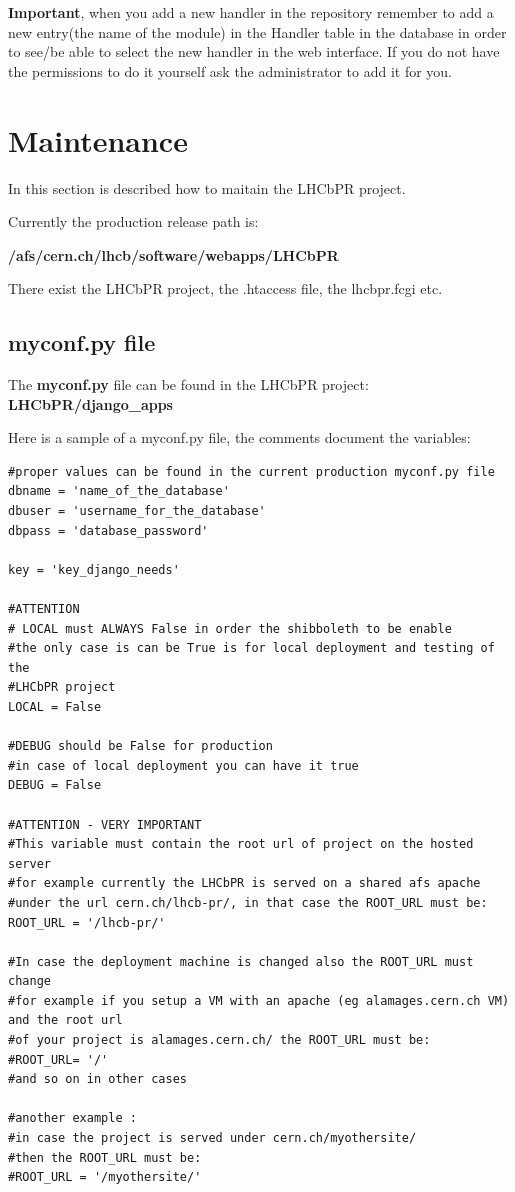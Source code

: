 \documentclass{lhcbnote}
\begin{document}
{\bf Important}, when you add a new handler in the repository remember to add a new entry(the name of the module) in the Handler table in the database
in order to see/be able to select the new handler in the web interface. If you do not have the permissions to do it yourself ask the administrator to add it for you.


\section {Maintenance}

In this section is described how to maitain the LHCbPR project.

\vspace {2mm}

Currently the production release path is: 

{\bf /afs/cern.ch/lhcb/software/webapps/LHCbPR}

There exist the LHCbPR project, the .htaccess file, the lhcbpr.fcgi etc.

\subsection{myconf.py file}

The {\bf myconf.py} file can be found in the LHCbPR project: {\bf LHCbPR/django\_apps}

Here is a sample of a myconf.py file, the comments document the variables:

\begin{verbatim}
#proper values can be found in the current production myconf.py file 
dbname = 'name_of_the_database'
dbuser = 'username_for_the_database'
dbpass = 'database_password'

key = 'key_django_needs'

#ATTENTION
# LOCAL must ALWAYS False in order the shibboleth to be enable
#the only case is can be True is for local deployment and testing of the
#LHCbPR project
LOCAL = False

#DEBUG should be False for production 
#in case of local deployment you can have it true
DEBUG = False

#ATTENTION - VERY IMPORTANT
#This variable must contain the root url of project on the hosted server
#for example currently the LHCbPR is served on a shared afs apache
#under the url cern.ch/lhcb-pr/, in that case the ROOT_URL must be:
ROOT_URL = '/lhcb-pr/'

#In case the deployment machine is changed also the ROOT_URL must change
#for example if you setup a VM with an apache (eg alamages.cern.ch VM) and the root url 
#of your project is alamages.cern.ch/ the ROOT_URL must be:
#ROOT_URL= '/'
#and so on in other cases

#another example :
#in case the project is served under cern.ch/myothersite/
#then the ROOT_URL must be:
#ROOT_URL = '/myothersite/'

\end{verbatim}
\end{document}
